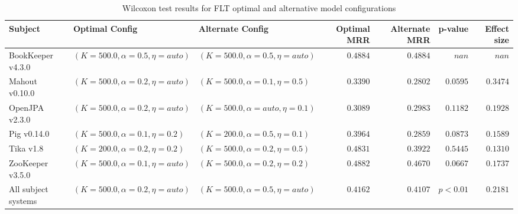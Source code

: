 \begin{landscape}

\begin{table}
\begin{spacing}{1.2}
\centering
\caption{Wilcoxon test results for FLT optimal and alternative model configurations}
\label{table:combo-flt-model-sweep-wilcox}
\begin{tabular}{lllrrrr}
\toprule
                      Subject &                      Optimal Config &                    Alternate Config & Optimal MRR & Alternate MRR &  p-value & Effect size \\
\midrule
            BookKeeper v4.3.0 &  $(K=500.0, \alpha=0.5, \eta=auto)$ &  $(K=500.0, \alpha=0.5, \eta=auto)$ &    $0.4884$ &      $0.4884$ &    $nan$ &       $nan$ \\
               Mahout v0.10.0 &  $(K=500.0, \alpha=0.2, \eta=auto)$ &   $(K=500.0, \alpha=0.1, \eta=0.5)$ &    $0.3390$ &      $0.2802$ & $0.0595$ &    $0.3474$ \\
               OpenJPA v2.3.0 &  $(K=500.0, \alpha=0.2, \eta=auto)$ &  $(K=500.0, \alpha=auto, \eta=0.1)$ &    $0.3089$ &      $0.2983$ & $0.1182$ &    $0.1928$ \\
                  Pig v0.14.0 &   $(K=500.0, \alpha=0.1, \eta=0.2)$ &   $(K=200.0, \alpha=0.5, \eta=0.1)$ &    $0.3964$ &      $0.2859$ & $0.0873$ &    $0.1589$ \\
                    Tika v1.8 &   $(K=200.0, \alpha=0.2, \eta=0.2)$ &   $(K=500.0, \alpha=0.2, \eta=0.5)$ &    $0.4831$ &      $0.3922$ & $0.5445$ &    $0.1310$ \\
             ZooKeeper v3.5.0 &  $(K=500.0, \alpha=0.1, \eta=auto)$ &   $(K=500.0, \alpha=0.2, \eta=0.2)$ &    $0.4882$ &      $0.4670$ & $0.0667$ &    $0.1737$ \\
 \midrule
All subject systems &  $(K=500.0, \alpha=0.2, \eta=auto)$ &  $(K=500.0, \alpha=0.5, \eta=auto)$ &    $0.4162$ &      $0.4107$ & $p<0.01$ &    $0.2181$ \\
\bottomrule
\end{tabular}

\end{spacing}
\end{table}



\end{landscape}
